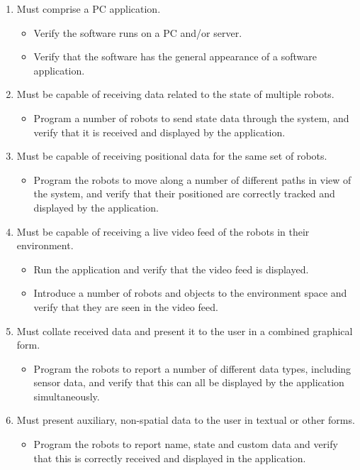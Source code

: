 \begin{enumerate}[label=C\arabic*.]
 \item Must comprise a PC application.
 \begin{itemize}
  \item Verify the software runs on a PC and/or server.
  \item Verify that the software has the general appearance of a software application.
 \end{itemize}
 
 \item Must be capable of receiving data related to the state of multiple robots.
 \begin{itemize}
  \item Program a number of robots to send state data through the system, and verify that it is received and displayed by the application.
 \end{itemize}
 
 \item Must be capable of receiving positional data for the same set of robots.
 \begin{itemize}
  \item Program the robots to move along a number of different paths in view of the system, and verify that their positioned are correctly tracked and displayed by the application.
 \end{itemize}
 
 \item Must be capable of receiving a live video feed of the robots in their environment.
 \begin{itemize}
  \item Run the application and verify that the video feed is displayed.
  \item Introduce a number of robots and objects to the environment space and verify that they are seen in the video feed.
 \end{itemize}
 
 \item Must collate received data and present it to the user in a combined graphical form.
 \begin{itemize}
  \item Program the robots to report a number of different data types, including sensor data, and verify that this can all be displayed by the application simultaneously.
 \end{itemize}
 
 \item Must present auxiliary, non-spatial data to the user in textual or other forms.
 \begin{itemize}
  \item Program the robots to report name, state and custom data and verify that this is correctly received and displayed in the application.
 \end{itemize}
 

\end{enumerate}
